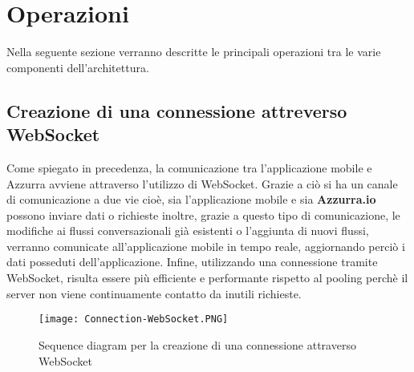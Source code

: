 \section{Operazioni}
Nella seguente sezione verranno descritte le principali operazioni tra le varie componenti dell'architettura.
\subsection{Creazione di una connessione attreverso WebSocket}
Come spiegato in precedenza, la comunicazione tra l'applicazione mobile e Azzurra avviene attraverso l'utilizzo di WebSocket. Grazie a ciò si ha un canale di comunicazione a due vie cioè, sia l'applicazione mobile e sia \textbf{Azzurra.io } possono inviare dati o richieste inoltre, grazie a questo tipo di comunicazione, le modifiche ai flussi conversazionali già esistenti o l'aggiunta di nuovi flussi, verranno comunicate all'applicazione mobile in tempo reale, aggiornando perciò i dati posseduti dell'applicazione. Infine, utilizzando una connessione tramite WebSocket, risulta essere più efficiente e performante rispetto al pooling perchè il server non viene continuamente contatto da inutili richieste.
\begin{figure}[h]
	\begin{center}
		\texttt{[image: Connection-WebSocket.PNG]}
		\caption{Sequence diagram per la creazione di una connessione attraverso WebSocket}\label{fig:websocket}
	\end{center}
\end{figure}

